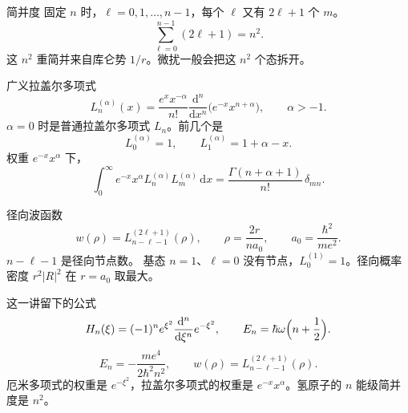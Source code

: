 \documentclass[fontset=windows, chinese, 10pt, xcolor=dvipsnames]{beamer}
\begin{document}
\begin{frame}{简并度}
  固定 $n$ 时，$\ell=0,1,\ldots,n-1$，每个 $\ell$ 又有 $2\ell+1$ 个 $m$。
  \[
    \sum_{\ell=0}^{n-1}(2\ell+1)=n^2.
  \]
  这 $n^2$ 重简并来自库仑势 $1/r$。微扰一般会把这 $n^2$ 个态拆开。
\end{frame}

\begin{frame}{广义拉盖尔多项式}
  \begin{equation*}
    L_n^{(\alpha)}(x)
    =\frac{e^{x} x^{-\alpha}}{n!}
      \frac{\mathrm{d}^n}{\mathrm{d}x^n}
      \bigl(e^{-x} x^{n+\alpha}\bigr),
    \qquad\alpha>-1.
  \end{equation*}
  $\alpha=0$ 时是普通拉盖尔多项式 $L_n$。前几个是
  \[
    L_0^{(\alpha)}=1,
    \qquad
    L_1^{(\alpha)}=1+\alpha-x.
  \]
  权重 $e^{-x}x^{\alpha}$ 下，
  \[
    \int_0^{\infty}
      e^{-x}x^{\alpha}
      L_n^{(\alpha)} L_m^{(\alpha)}\,\mathrm{d}x
    =\frac{\Gamma(n+\alpha+1)}{n!}\,\delta_{mn}.
  \]
\end{frame}

\begin{frame}{径向波函数}
  \[
    w(\rho)=L_{n-\ell-1}^{(2\ell+1)}(\rho),
    \qquad
    \rho=\frac{2r}{n a_0},
    \qquad
    a_0=\frac{\hbar^2}{m e^2}.
  \]
  $n-\ell-1$ 是径向节点数。
  \vspace{0.35em}
  基态 $n=1$、$\ell=0$ 没有节点，$L_0^{(1)}=1$。径向概率密度 $r^2|R|^2$ 在 $r=a_0$ 取最大。
\end{frame}

\begin{frame}{这一讲留下的公式}
  \[
    H_n(\xi)
    =(-1)^n e^{\xi^2}\frac{\mathrm{d}^n}{\mathrm{d}\xi^n}e^{-\xi^2},
    \qquad
    E_n=\hbar\omega\Bigl(n+\frac12\Bigr).
  \]
  \[
    E_n=-\frac{m e^4}{2\hbar^2 n^2},
    \qquad
    w(\rho)=L_{n-\ell-1}^{(2\ell+1)}(\rho).
  \]
  厄米多项式的权重是 $e^{-\xi^2}$，拉盖尔多项式的权重是 $e^{-x}x^{\alpha}$。氢原子的 $n$ 能级简并度是 $n^2$。
\end{frame}
\end{document}
